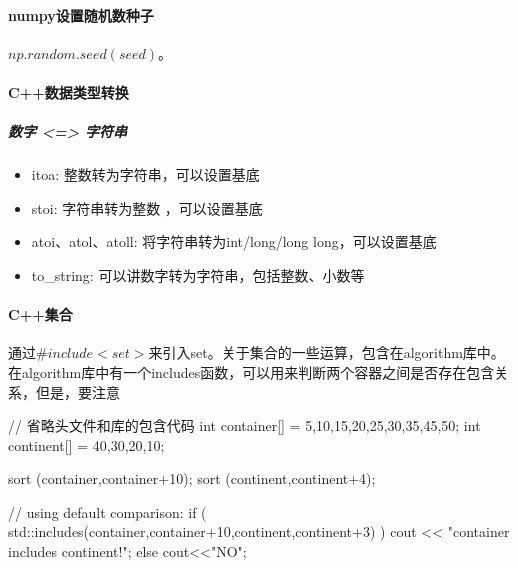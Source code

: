 \paragraph{numpy设置随机数种子}$np.random.seed(seed)$。

\paragraph{C++数据类型转换}
\subparagraph{数字 <=> 字符串}
\begin{itemize}
	\item itoa: 整数转为字符串，可以设置基底
	\item stoi: 字符串转为整数 ，可以设置基底
	\item atoi、atol、atoll: 将字符串转为int/long/long long，可以设置基底
	\item to\_string: 可以讲数字转为字符串，包括整数、小数等
\end{itemize}

\paragraph{C++集合} 通过$\#include<set>$来引入set。关于集合的一些运算，包含在algorithm库中。在algorithm库中有一个includes函数，可以用来判断两个容器之间是否存在包含关系，但是，要注意
\begin{cpp}
	// 省略头文件和库的包含代码
	int container[] = {5,10,15,20,25,30,35,45,50};
	int continent[] = {40,30,20,10};
	
	sort (container,container+10);
	sort (continent,continent+4);
	
	// using default comparison:
	if ( std::includes(container,container+10,continent,continent+3) )
		cout << "container includes continent!\n";
	else	cout<<"NO\n";
	
\end{cpp}







